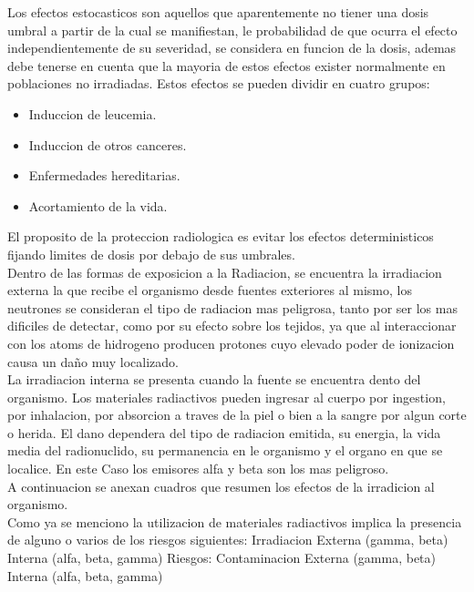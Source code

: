 \documentclass[11pt, oneside]{book}
\begin{document}
Los efectos estocasticos son aquellos que aparentemente no tiener
una dosis umbral a partir de la cual se manifiestan, le
probabilidad de que ocurra el efecto independientemente de su
severidad, se considera en funcion de la dosis, ademas debe
tenerse en cuenta que la mayoria de estos efectos exister
normalmente en poblaciones no irradiadas. Estos efectos se pueden
dividir en cuatro grupos:\\

\begin{itemize}
\item Induccion de leucemia.
\item Induccion de otros canceres.
\item Enfermedades hereditarias.
\item Acortamiento de la vida.
\end{itemize}

El proposito de la proteccion radiologica es evitar los efectos
deterministicos fijando limites de dosis por debajo de sus
umbrales.\\

Dentro de las formas de exposicion a la Radiacion, se encuentra
la irradiacion externa la que recibe el organismo desde fuentes
exteriores al mismo, los neutrones se consideran el tipo de
radiacion mas peligrosa, tanto por ser los mas dificiles de
detectar, como por su efecto sobre los tejidos, ya que al
interaccionar con los atoms de hidrogeno producen protones cuyo
elevado poder de ionizacion causa un daño muy localizado.\\

La irradiacion interna se presenta cuando la fuente se encuentra
dento del organismo. Los materiales radiactivos pueden ingresar
al cuerpo por ingestion, por inhalacion, por absorcion a traves
de la piel o bien a la sangre por algun corte o herida. El dano
dependera del tipo de radiacion emitida, su energia, la vida
media del radionuclido, su permanencia en le organismo y el
organo en que se localice. En este Caso los emisores alfa y
beta son los mas peligroso.\\

A continuacion se anexan cuadros que resumen los efectos de
la irradicion al organismo.\\


Como ya se menciono la utilizacion de materiales radiactivos
implica la presencia de alguno o varios de los riesgos
siguientes:
Irradiacion
Externa (gamma, beta)
Interna (alfa, beta, gamma)
Riesgos:
Contaminacion Externa (gamma, beta)
Interna (alfa, beta, gamma)
\end{document}
